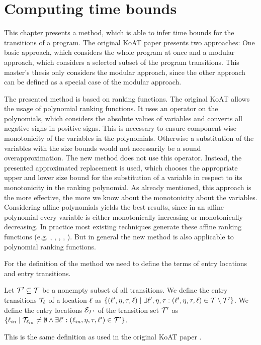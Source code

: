 \section{Computing time bounds}

This chapter presents a method, which is able to infer time bounds for the transitions of a program.
The original KoAT paper \cite{koat} presents two approaches: One basic approach, which considers the whole program at once and a modular approach, which considers a selected subset of the program transitions.
This master's thesis only considers the modular approach, since the other approach can be defined as a special case of the modular approach.

The presented method is based on ranking functions.
The original KoAT allows the usage of polynomial ranking functions.
It uses an operator on the polynomials, which considers the absolute values of variables and converts all negative signs in positive signs.
This is necessary to ensure component-wise monotonicity of the variables in the polynomials.
Otherwise a substitution of the variables with the size bounds would not necessarily be a sound overapproximation.
The new method does not use this operator.
Instead, the presented approximated replacement is used, which chooses the appropriate upper and lower size bound for the substitution of a variable in respect to its monotonicity in the ranking polynomial.
As already mentioned, this approach is the more effective, the more we know about the monotonicity about the variables.
Considering affine polynomials yields the best results, since in an affine polynomial every variable is either monotonically increasing or monotonically decreasing.
In practice most existing techniques generate these affine ranking functions (e.g. \cite{podelski2004prf}, \cite{bradley2005linear}, \cite{bagnara2012new}, \cite{leike2014ranking}, \cite{ben2013linear}).
But in general the new method is also applicable to polynomial ranking functions.

For the definition of the method we need to define the terms of entry locations and entry transitions.
\begin{definition}
  Let $\mathcal{T}' \subseteq \mathcal{T}$ be a nonempty subset of all transitions.
  We define the entry transitions $\mathcal{T}_{\ell}$ of a location $\ell$ as $\lbrace (\ell', \eta, \tau, \ell) \mid \exists \ell', \eta, \tau: (\ell', \eta, \tau, \ell) \in \mathcal{T} \setminus \mathcal{T}' \rbrace$.
  We define the entry locations $\mathcal{E}_{\mathcal{T}'}$ of the transition set $\mathcal{T}'$ as $\lbrace \ell_{in} \mid \mathcal{T}_{\ell_{in}} \neq \emptyset \wedge \exists \ell': (\ell_{in}, \eta, \tau, \ell') \in \mathcal{T}' \rbrace$.
\end{definition}
This is the same definition as used in the original KoAT paper \cite{koat}.

